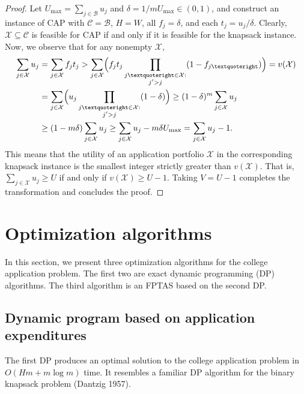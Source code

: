 \begin{proof}
Let $U_{\mathrm{max}} = \sum_{j \in \mathcal{B}} u_j$ and $\delta = {1} /{m U_{\mathrm{max}}} \in (0, 1)$, and construct an instance of CAP with $\mathcal{C} = \mathcal{B}$, $H = W$, all $f_j = \delta$, and each $t_j = u_j / \delta$. Clearly, $\mathcal{X} \subseteq \mathcal{C}$ is feasible for CAP if and only if it is feasible for the knapsack instance. Now, we observe that for any nonempty $\mathcal{X}$,
\begin{align}
\begin{split}
\sum_{j \in \mathcal{X}} u_j &=  \sum_{j \in \mathcal{X}} f_j t_j
> \sum_{j \in \mathcal{X}} \Bigl( f_j t_j \prod_{\substack{j’ \in \mathcal{X}: \\ j' > j}} (1 - f_{j’}) \Bigr)
= v(\mathcal{X}) \\
&= \sum_{j \in \mathcal{X}} \Bigl( u_j  \prod_{\substack{j’ \in \mathcal{X}: \\ j' > j}} (1 - \delta) \Bigr)
\geq (1 - \delta)^m \sum_{j \in \mathcal{X}} u_j \\
&\geq (1 - m\delta) \sum_{j \in \mathcal{X}} u_j 
\geq \sum_{j \in \mathcal{X}} u_j  - m\delta U_{\mathrm{max}}
= \sum_{j \in \mathcal{X}} u_j  - 1.
\end{split}
\end{align}
This means that the utility of an application portfolio $\mathcal{X}$ in the corresponding knapsack instance is the smallest integer strictly greater than $v( \mathcal{X})$. That is, $\sum_{j \in \mathcal{X}} u_j \geq U$ if and only if $v(\mathcal{X}) \geq U -1$. Taking $V = U-1$ completes the transformation and concludes the proof. 
\end{proof}






\section{Optimization algorithms} \label{sectionAlgos}

In this section, we present three optimization algorithms for the college application problem. The first two are exact dynamic programming (DP) algorithms. The third algorithm is an FPTAS based on the second DP.



\subsection{Dynamic program based on application expenditures}
The first DP produces an optimal solution to the college application problem in $O(Hm + m\log m)$ time. It resembles a familiar DP algorithm for the binary knapsack problem (Dantzig 1957).

